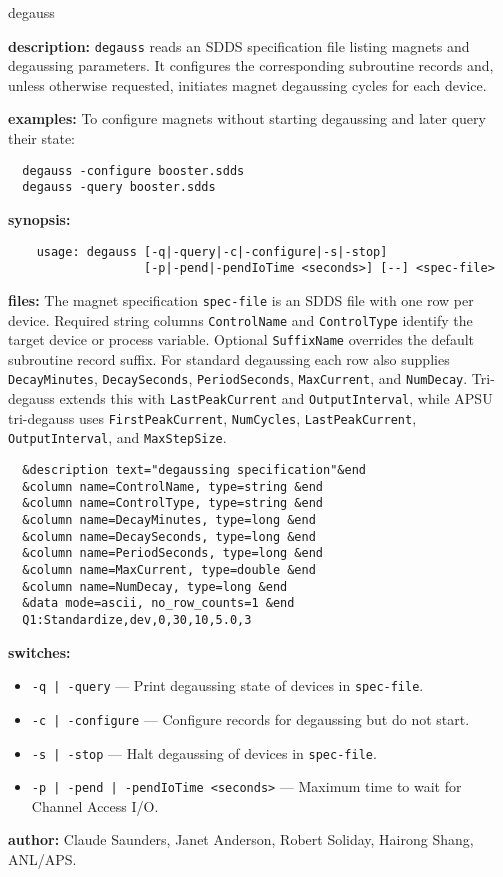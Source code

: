 \begin{sddsprog}{degauss}
\item \textbf{description:}
\verb+degauss+ reads an SDDS specification file listing magnets and degaussing parameters.
It configures the corresponding subroutine records and, unless otherwise requested, initiates
magnet degaussing cycles for each device.
\item \textbf{examples:}
To configure magnets without starting degaussing and later query their state:
\begin{verbatim}
  degauss -configure booster.sdds
  degauss -query booster.sdds
\end{verbatim}
\item \textbf{synopsis:}
  \begin{verbatim}
    usage: degauss [-q|-query|-c|-configure|-s|-stop]
                   [-p|-pend|-pendIoTime <seconds>] [--] <spec-file>

  \end{verbatim}
\item \textbf{files:}
  The magnet specification \verb+spec-file+ is an SDDS file with one row per device.
  Required string columns \verb+ControlName+ and \verb+ControlType+ identify the target device or process variable.
  Optional \verb+SuffixName+ overrides the default subroutine record suffix.
  For standard degaussing each row also supplies \verb+DecayMinutes+, \verb+DecaySeconds+, \verb+PeriodSeconds+,
  \verb+MaxCurrent+, and \verb+NumDecay+.
  Tri-degauss extends this with \verb+LastPeakCurrent+ and \verb+OutputInterval+,
  while APSU tri-degauss uses \verb+FirstPeakCurrent+, \verb+NumCycles+, \verb+LastPeakCurrent+,
  \verb+OutputInterval+, and \verb+MaxStepSize+.
  \begin{verbatim}
  &description text="degaussing specification"&end
  &column name=ControlName, type=string &end
  &column name=ControlType, type=string &end
  &column name=DecayMinutes, type=long &end
  &column name=DecaySeconds, type=long &end
  &column name=PeriodSeconds, type=long &end
  &column name=MaxCurrent, type=double &end
  &column name=NumDecay, type=long &end
  &data mode=ascii, no_row_counts=1 &end
  Q1:Standardize,dev,0,30,10,5.0,3
  \end{verbatim}
\item \textbf{switches:}
\begin{itemize}
  \item {\tt -q\,|\,-query} --- Print degaussing state of devices in {\tt spec-file}.
  \item {\tt -c\,|\,-configure} --- Configure records for degaussing but do not start.
  \item {\tt -s\,|\,-stop} --- Halt degaussing of devices in {\tt spec-file}.
  \item {\tt -p\,|\,-pend\,|\,-pendIoTime <seconds>} --- Maximum time to wait for Channel Access I/O.
\end{itemize}
\item \textbf{author:} Claude Saunders, Janet Anderson, Robert Soliday, Hairong Shang, ANL/APS.
\end{sddsprog}

